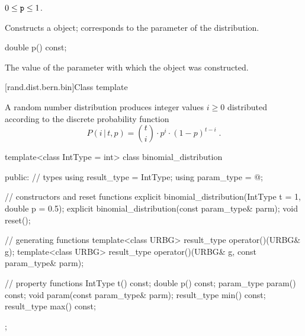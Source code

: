 \begin{itemdescr}
\pnum\requires
 $0 \leq \texttt{\protect p} \leq 1$.

\pnum\effects Constructs a  object;
 corresponds to the parameter of the distribution.
\end{itemdescr}

%
\begin{itemdecl}
double p() const;
\end{itemdecl}

\begin{itemdescr}
\pnum\returns The value of the  parameter
 with which the object was constructed.
\end{itemdescr}


[rand.dist.bern.bin]{Class template }%
%
%

\pnum
A  random number distribution
produces integer values $i \geq 0$
distributed according to
the discrete probability function%
%
%
\[%
 P(i\,|\,t,p)
      = \binom{t}{i} \cdot p^i \cdot (1-p)^{t-i}
\; \mbox{.}
\]

%
\begin{codeblock}
template<class IntType = int>
  class binomial_distribution {
  public:
    // types
    using result_type = IntType;
    using param_type  = @\unspec@;

    // constructors and reset functions
    explicit binomial_distribution(IntType t = 1, double p = 0.5);
    explicit binomial_distribution(const param_type& parm);
    void reset();

    // generating functions
    template<class URBG>
      result_type operator()(URBG& g);
    template<class URBG>
      result_type operator()(URBG& g, const param_type& parm);

    // property functions
    IntType t() const;
    double p() const;
    param_type param() const;
    void param(const param_type& parm);
    result_type min() const;
    result_type max() const;
  };
\end{codeblock}


